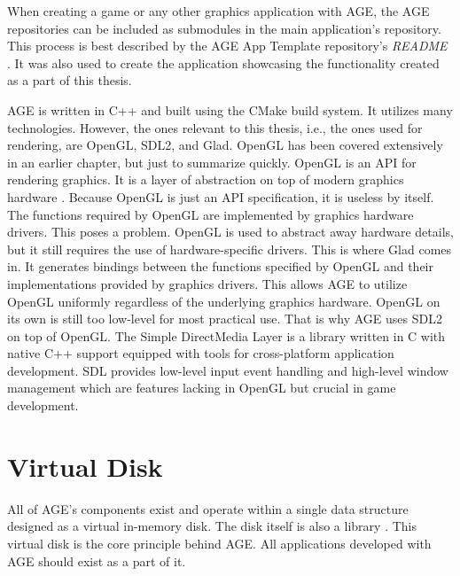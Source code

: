 \documentclass[
  digital,     %
  oneside,     %
  nosansbold,  %
  nocolorbold, %
  lof,         %
  lot,         %
]{fithesis4}
\begin{document}
When creating a game or any other graphics application with AGE, the AGE repositories can be included as submodules
in the main application's repository. This process is best described by the AGE App Template repository's
\textit{README} \cite{age-app-template-readme}. It was also used to create the application
showcasing the functionality created as a part of this thesis.

AGE is written in C++ and built using the CMake build system. It utilizes many technologies. However,
the ones relevant to this thesis, i.e., the ones used for rendering, are OpenGL, SDL2, and Glad.
OpenGL has been covered extensively in an earlier chapter, but just to summarize quickly. OpenGL is an
API for rendering graphics. It is a layer of abstraction on top of modern graphics hardware \cite{khronos}.
Because OpenGL is just an API specification, it is useless by itself.
The functions required by OpenGL are implemented by graphics hardware drivers. This poses a problem.
OpenGL is used to abstract away hardware details, but it still requires the use of hardware-specific drivers.
This is where Glad \cite{glad} comes in. It generates bindings between the functions specified by OpenGL
and their implementations provided by graphics drivers. This allows AGE to utilize OpenGL uniformly
regardless of the underlying graphics hardware. OpenGL on its own is still too low-level
for most practical use. That is why AGE uses SDL2 on top of OpenGL. The Simple DirectMedia Layer \cite{sdl}
is a library written in C with native C++ support equipped with tools for cross-platform application
development. SDL provides low-level input event handling and high-level window management which are features lacking in OpenGL
but crucial in game development.

\section{Virtual Disk}
All of AGE's components exist and operate within a single data structure designed as a virtual in-memory disk.
The disk itself is also a library \cite{age-app-template-readme}.
This virtual disk is the core principle behind AGE. All applications developed with AGE should
exist as a part of it.
\end{document}
